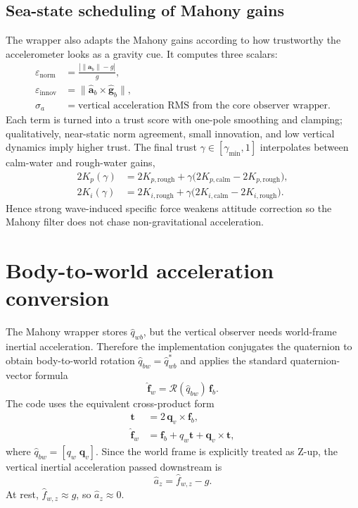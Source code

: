 \documentclass[conference]{IEEEtran}
\newcommand{\vct}[1]{\bm{#1}}
\begin{document}
\subsection{Sea-state scheduling of Mahony gains}
The wrapper also adapts the Mahony gains according to how trustworthy the accelerometer looks as a gravity cue. It computes three scalars:
\begin{align}
\varepsilon_{\mathrm{norm}} &= \frac{\left|\lVert \vct{a}_b\rVert - g\right|}{g},\\
\varepsilon_{\mathrm{innov}} &= \lVert \hat{\vct{a}}_b \times \hat{\vct{g}}_b \rVert,\\
\sigma_a &= \text{vertical acceleration RMS from the core observer wrapper}.
\end{align}
Each term is turned into a trust score with one-pole smoothing and clamping; qualitatively, near-static norm agreement, small innovation, and low vertical dynamics imply higher trust. The final trust $\gamma\in[\gamma_{\min},1]$ interpolates between calm-water and rough-water gains,
\begin{align}
2K_p(\gamma) &= 2K_{p,\mathrm{rough}} + \gamma\bigl(2K_{p,\mathrm{calm}}-2K_{p,\mathrm{rough}}\bigr),\\
2K_i(\gamma) &= 2K_{i,\mathrm{rough}} + \gamma\bigl(2K_{i,\mathrm{calm}}-2K_{i,\mathrm{rough}}\bigr).
\end{align}
Hence strong wave-induced specific force weakens attitude correction so the Mahony filter does not chase non-gravitational acceleration.

\section{Body-to-world acceleration conversion}
The Mahony wrapper stores $\hat{q}_{wb}$, but the vertical observer needs world-frame inertial acceleration. Therefore the implementation conjugates the quaternion to obtain body-to-world rotation $\hat{q}_{bw}=\hat{q}_{wb}^{\ast}$ and applies the standard quaternion-vector formula
\begin{equation}
\hat{\vct{f}}_w = \mathcal{R}(\hat{q}_{bw})\,\vct{f}_b.
\end{equation}
The code uses the equivalent cross-product form
\begin{align}
\vct{t} &= 2\,\vct{q}_v \times \vct{f}_b,\\
\hat{\vct{f}}_w &= \vct{f}_b + q_w\vct{t} + \vct{q}_v \times \vct{t},
\end{align}
where $\hat{q}_{bw}=[q_w\;\vct{q}_v]$. Since the world frame is explicitly treated as Z-up, the vertical inertial acceleration passed downstream is
\begin{equation}
\hat{a}_z = \hat{f}_{w,z} - g.
\end{equation}
At rest, $\hat{f}_{w,z}\approx g$, so $\hat{a}_z\approx 0$.
\end{document}
